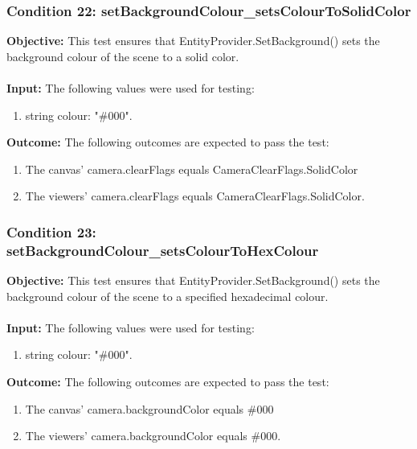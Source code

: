 \documentclass[a4paper,12pt]{article}
\begin{document}
		\subsubsection{Condition 22: setBackgroundColour\_setsColourToSolidColor}
			\textbf{Objective:} This test ensures that EntityProvider.SetBackground() sets the background colour of the scene to a solid color.\\\\
			\textbf{Input:} The following values were used for testing:
				\begin{enumerate}
					\item string colour: "\#000".
				\end{enumerate}
			\textbf{Outcome:} The following outcomes are expected to pass the test:
				\begin{enumerate}
					\item The canvas' camera.clearFlags equals CameraClearFlags.SolidColor
					\item The viewers' camera.clearFlags equals CameraClearFlags.SolidColor.
				\end{enumerate}
		\subsubsection{Condition 23: setBackgroundColour\_setsColourToHexColour}
			\textbf{Objective:} This test ensures that EntityProvider.SetBackground() sets the background colour of the scene to a specified hexadecimal colour.\\\\
			\textbf{Input:} The following values were used for testing:
				\begin{enumerate}
					\item string colour: "\#000".
				\end{enumerate}
			\textbf{Outcome:} The following outcomes are expected to pass the test:
				\begin{enumerate}
					\item The canvas' camera.backgroundColor equals \#000
					\item The viewers' camera.backgroundColor equals \#000.
				\end{enumerate}
\end{document}
